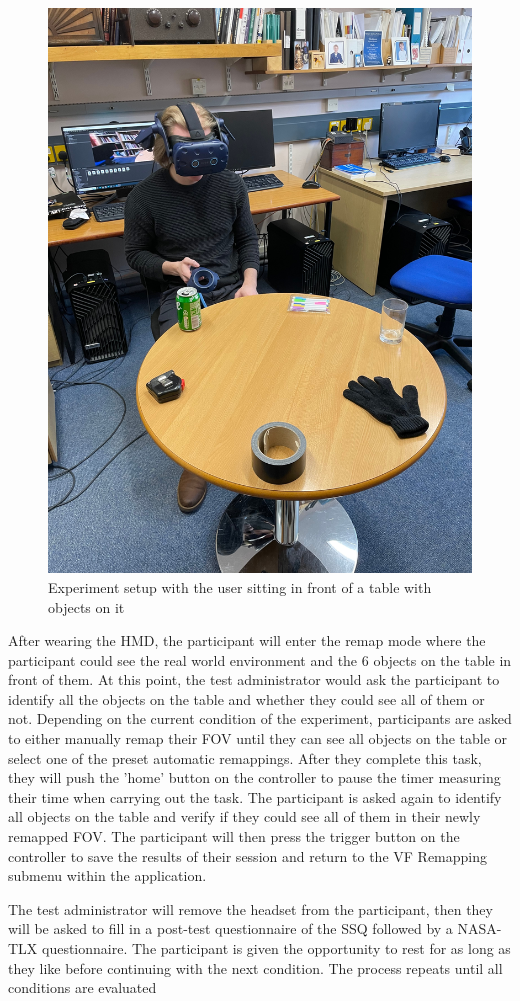 \documentclass{l4proj}
\begin{document}
\begin{figure}[!h]
    \centering
    \includegraphics[width=0.7\linewidth]{images/TestAdminView.jpg}
    \caption{Experiment setup with the user sitting in front of a table with objects on it}
    \label{fig:tableSetup}
\end{figure}

After wearing the HMD, the participant will enter the remap mode where the participant could see the real world environment and the 6 objects on the table in front of them. At this point, the test administrator would ask the participant to identify all the objects on the table and whether they could see all of them or not. Depending on the current condition of the experiment, participants are asked to either manually remap their FOV until they can see all objects on the table or select one of the preset automatic remappings. After they complete this task, they will push the 'home' button on the controller to pause the timer measuring their time when carrying out the task. The participant is asked again to identify all objects on the table and verify if they could see all of them in their newly remapped FOV. The participant will then press the trigger button on the controller to save the results of their session and return to the VF Remapping submenu within the application.

The test administrator will remove the headset from the participant, then they will be asked to fill in a post-test questionnaire of the SSQ followed by a NASA-TLX questionnaire. The participant is given the opportunity to rest for as long as they like before continuing with the next condition. The process repeats until all conditions are evaluated
\end{document}
